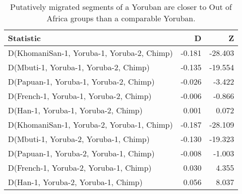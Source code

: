 \begin{table}[ht]
\centering
\begin{tabular}{lrr}
  \hline
Statistic & D & Z \\ 
  \hline
D(KhomaniSan-1, Yoruba-1, Yoruba-2, Chimp) & -0.181 & -28.403 \\ 
  D(Mbuti-1, Yoruba-1, Yoruba-2, Chimp) & -0.135 & -19.554 \\ 
  D(Papuan-1, Yoruba-1, Yoruba-2, Chimp) & -0.026 & -3.422 \\ 
  D(French-1, Yoruba-1, Yoruba-2, Chimp) & -0.006 & -0.866 \\ 
  D(Han-1, Yoruba-1, Yoruba-2, Chimp) & 0.001 & 0.072 \\ 
  D(KhomaniSan-1, Yoruba-2, Yoruba-1, Chimp) & -0.187 & -28.109 \\ 
  D(Mbuti-1, Yoruba-2, Yoruba-1, Chimp) & -0.130 & -19.323 \\ 
  D(Papuan-1, Yoruba-2, Yoruba-1, Chimp) & -0.008 & -1.003 \\ 
  D(French-1, Yoruba-2, Yoruba-1, Chimp) & 0.030 & 4.355 \\ 
  D(Han-1, Yoruba-2, Yoruba-1, Chimp) & 0.056 & 8.037 \\ 
   \hline
\end{tabular}
\caption{Putatively migrated segments of a Yoruban are closer to Out of Africa groups than a comparable Yoruban.} 
\label{dstats:a1}
\end{table}
